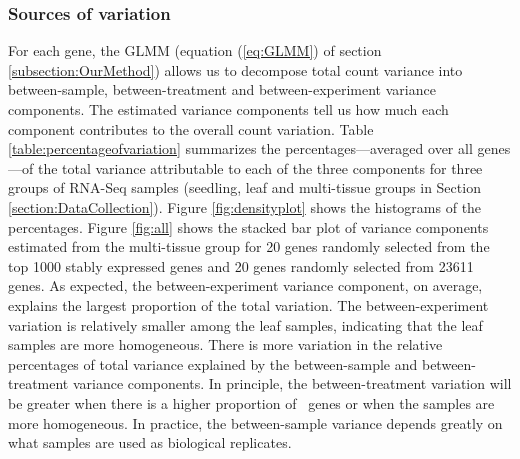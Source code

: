 	
	\subsubsection{Sources of variation}\label{Section:varianceComp}
	
	For each gene, the GLMM (equation (\ref{eq:GLMM}) of section
	\ref{subsection:OurMethod}) allows us to decompose total count variance into
	between-sample, between-treatment and between-experiment variance components.
	The estimated variance components tell us how much each component contributes
	to the overall count variation. Table \ref{table:percentageofvariation}
	summarizes the percentages---averaged over all genes---of the total variance
	attributable to each of the three components for three groups of RNA-Seq
	samples (seedling, leaf and multi-tissue groups in Section
	\ref{section:DataCollection}). Figure \ref{fig:densityplot} shows the
	histograms of the percentages.  Figure \ref{fig:all} shows the stacked bar
	plot of variance components estimated from the multi-tissue group for 20 genes
	randomly selected from the top 1000 stably expressed genes and 20 genes
	randomly selected from 23611 genes.  As expected, the between-experiment
	variance component, on average, explains the largest proportion of the total
	variation. The between-experiment variation is relatively smaller among the
	leaf samples, indicating that the leaf samples are more homogeneous.  There is
	more variation in the relative percentages of total variance explained by the
	between-sample and between-treatment variance components. In principle, the
	between-treatment variation will be greater when there is a higher proportion
	of \DED~genes or when the samples are more homogeneous. In practice, the
	between-sample variance depends greatly on what samples are used as biological
	replicates. 
	
	
